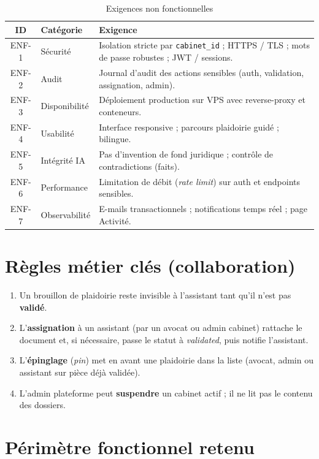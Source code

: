 \begin{table}[H]
\centering
\caption{Exigences non fonctionnelles}
\label{tab:enf}
\small
\renewcommand{\arraystretch}{1.2}
\begin{tabular}{@{}clp{9.8cm}@{}}
\toprule
\textbf{ID} & \textbf{Catégorie} & \textbf{Exigence} \\
\midrule
ENF-1 & Sécurité & Isolation stricte par \texttt{cabinet\_id} ; HTTPS / TLS ; mots de passe robustes ; JWT / sessions. \\
ENF-2 & Audit & Journal d'audit des actions sensibles (auth, validation, assignation, admin). \\
ENF-3 & Disponibilité & Déploiement production sur VPS avec reverse-proxy et conteneurs. \\
ENF-4 & Usabilité & Interface responsive ; parcours plaidoirie guidé ; bilingue. \\
ENF-5 & Intégrité IA & Pas d'invention de fond juridique ; contrôle de contradictions (faits). \\
ENF-6 & Performance & Limitation de débit (\textit{rate limit}) sur auth et endpoints sensibles. \\
ENF-7 & Observabilité & E-mails transactionnels ; notifications temps réel ; page Activité. \\
\bottomrule
\end{tabular}
\end{table}

\section{Règles métier clés (collaboration)}

\begin{enumerate}[leftmargin=1.4em]
  \item Un brouillon de plaidoirie reste invisible à l'assistant tant qu'il n'est pas \textbf{validé}.
  \item L'\textbf{assignation} à un assistant (par un avocat ou admin cabinet) rattache le document et, si nécessaire, passe le statut à \textit{validated}, puis notifie l'assistant.
  \item L'\textbf{épinglage} (\textit{pin}) met en avant une plaidoirie dans la liste (avocat, admin ou assistant sur pièce déjà validée).
  \item L'admin plateforme peut \textbf{suspendre} un cabinet actif ; il ne lit pas le contenu des dossiers.
\end{enumerate}

\section{Périmètre fonctionnel retenu}

